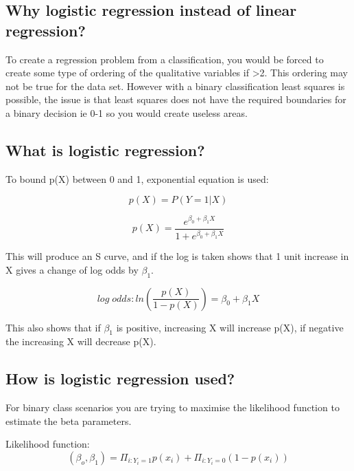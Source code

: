 \documentclass[11pt]{scrartcl} %
\begin{document}
\subsection{Why logistic regression instead of linear regression?}

To create a regression problem from a classification, you would be forced to create some type of ordering of the qualitative
variables if >2. This ordering may not be true for the data set. However with a binary classification least squares is possible, the
issue is that least squares does not have the required boundaries for a binary decision ie 0-1 so you would create useless areas.

\subsection{What is logistic regression?}

To bound p(X) between 0 and 1, exponential equation is used:

\begin{equation}
	p(X) = P(Y=1|X)
\end{equation}

\begin{equation}
	p(X) = \frac{e^{\beta_0 + \beta_1X}}{1+e^{\beta_0 + \beta_1X}}
\end{equation}

This will produce an S curve, and if the log is taken shows that 1 unit increase in X gives a change of log odds by 
\( \beta_1\).

\begin{equation}
	log\; odds: ln(\frac{p(X)}{1-p(X)}) = \beta_0 + \beta_1X
\end{equation}

This also shows that if \(\beta_1\) is positive, increasing X will increase p(X), if negative the increasing X will
decrease p(X).

\subsection{How is logistic regression used?}

For binary class scenarios you are trying to maximise the likelihood function to estimate the beta parameters.

Likelihood function:
\begin{equation}
	(\beta_o,\beta_1) = \Pi_{i:Y_i=1}p(x_i) + \Pi_{i:Y_i=0}(1-p(x_i))
\end{equation}
\end{document}
